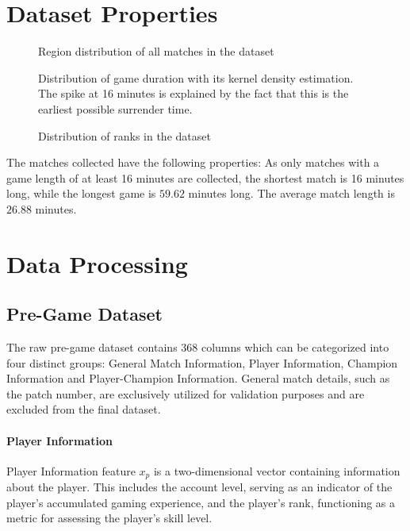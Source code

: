 \documentclass[12pt, a4paper, headinclude, twoside, plainheadsepline, open=right, numbers=noenddot, hidelinks, toc=listof, toc=bibliography]{scrreprt}
\begin{document}
\section{Dataset Properties}
\label{sec:dataprop}

\begin{figure}

\caption{Region distribution of all matches in the dataset}
\label{fig:platformId}
\end{figure}

\begin{figure}

\caption{Distribution of game duration with its kernel density estimation. The spike at 16 minutes is explained by the fact that this is the earliest possible surrender time.}
\label{fig:gameDuration}
\end{figure}


\begin{figure}
\resizebox{\textwidth}{!}{}
\caption{Distribution of ranks in the dataset}
\label{fig:tier}
\end{figure}

The matches collected have the following properties: 
As only matches with a game length of at least 16 minutes are collected, the shortest match is 16 minutes long, while the longest game is $59.62$ minutes long.
The average match length is $26.88$ minutes.


\section{Data Processing}
\label{sec:data_processing}

\subsection{Pre-Game Dataset}
\label{ssec:pre_game_data}
The raw pre-game dataset contains $368$ columns which can be categorized into four distinct groups: General Match Information, Player Information, Champion Information and Player-Champion Information.
General match details, such as the patch number, are exclusively utilized for validation purposes and are excluded from the final dataset.
\paragraph{Player Information}
Player Information feature $x_p$ is a two-dimensional vector containing information about the player. This includes the account level, serving as an indicator of the player's accumulated gaming experience, and the player's rank, functioning as a metric for assessing the player's skill level.
\end{document}
